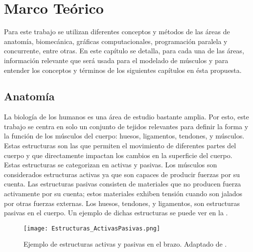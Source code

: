 \chapter{Marco Teórico} %

\label{MarcoTeorico} %



Para este trabajo se utilizan diferentes conceptos y métodos de las áreas de anatomía, biomecánica, gráficas computacionales, programación paralela y concurrente, entre otras. En este capítulo se detalla, para cada una de las áreas, información relevante que será usada para el modelado de músculos y para entender los conceptos y términos de los siguientes capítulos en ésta propuesta.

\section{Anatomía}

La biología de los humanos es una área de estudio bastante amplia. Por esto, este trabajo se centra en solo un conjunto de tejidos relevantes para definir la forma y la función de los músculos del cuerpo: huesos, ligamentos, tendones, y músculos. Estas estructuras son las que permiten el movimiento de diferentes partes del cuerpo y que directamente impactan los cambios en la superficie del cuerpo. Estas estructuras se categorizan en activas y pasivas. Los músculos son considerados estructuras activas ya que son capaces de producir fuerzas por su cuenta. Las estructuras pasivas consisten de materiales que no producen fuerza activamente por su cuenta; estos materiales exhiben tensión cuando son jalados por otras fuerzas externas. Los huesos, tendones, y ligamentos, son estructuras pasivas en el cuerpo. Un ejemplo de dichas estructuras se puede ver en la .

\begin{figure}
	\centering
		\texttt{[image: Estructuras\_ActivasPasivas.png]}
	\caption[Ejemplo de estructuras activas y pasivas en el brazo.]{Ejemplo de estructuras activas y pasivas en el brazo. Adaptado de \citep{oatis2009kynesiology}.}
	\label{fig:activePasiveStructures}
\end{figure}

